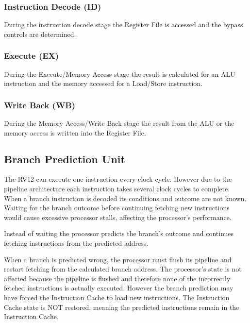 \subsubsection{Instruction Decode (ID)}\label{instruction-decode-id}

During the instruction decode stage the Register File is accessed and
the bypass controls are determined.

\subsubsection{Execute (EX)}\label{execute-ex}

During the Execute/Memory Access stage the result is calculated for an
ALU instruction and the memory accessed for a Load/Store instruction.

\subsubsection{Write Back (WB)}\label{write-back-wb}

During the Memory Access/Write Back stage the result from the ALU or the
memory access is written into the Register
File.\protect\hypertarget{_Toc326677721}{}{}


\missingfigure{}

\subsection{Branch Prediction Unit}\label{branch-prediction-unit}

The RV12 can execute one instruction every clock cycle. However due to
the pipeline architecture each instruction takes several clock cycles to
complete. When a branch instruction is decoded its conditions and
outcome are not known. Waiting for the branch outcome before continuing
fetching new instructions would cause excessive processor stalls,
affecting the processor's performance.

Instead of waiting the processor predicts the branch's outcome and
continues fetching instructions from the predicted address.

When a branch is predicted wrong, the processor must flush its pipeline
and restart fetching from the calculated branch address. The processor's
state is not affected because the pipeline is flushed and therefore none
of the incorrectly fetched instructions is actually executed. However
the branch prediction may have forced the Instruction Cache to load new
instructions. The Instruction Cache state is NOT restored, meaning the
predicted instructions remain in the Instruction Cache.

